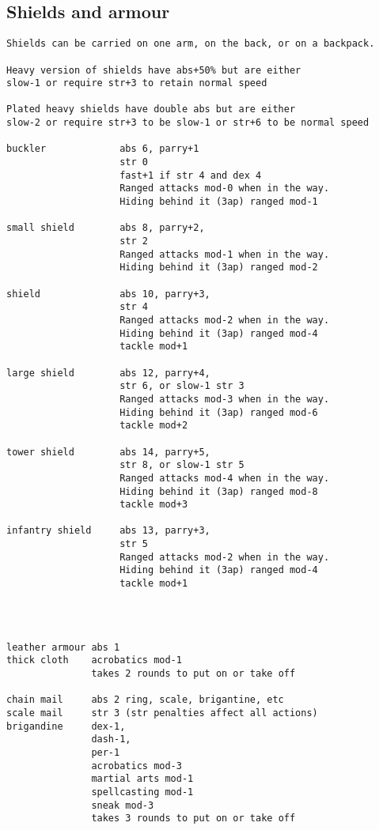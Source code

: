 \subsection*{Shields and armour}
\small
\begin{verbatim}
Shields can be carried on one arm, on the back, or on a backpack.

Heavy version of shields have abs+50% but are either
slow-1 or require str+3 to retain normal speed

Plated heavy shields have double abs but are either
slow-2 or require str+3 to be slow-1 or str+6 to be normal speed

buckler             abs 6, parry+1
                    str 0
                    fast+1 if str 4 and dex 4
                    Ranged attacks mod-0 when in the way.
                    Hiding behind it (3ap) ranged mod-1

small shield        abs 8, parry+2,
                    str 2
                    Ranged attacks mod-1 when in the way.
                    Hiding behind it (3ap) ranged mod-2

shield              abs 10, parry+3,
                    str 4
                    Ranged attacks mod-2 when in the way.
                    Hiding behind it (3ap) ranged mod-4
                    tackle mod+1

large shield        abs 12, parry+4,
                    str 6, or slow-1 str 3
                    Ranged attacks mod-3 when in the way.
                    Hiding behind it (3ap) ranged mod-6
                    tackle mod+2

tower shield        abs 14, parry+5,
                    str 8, or slow-1 str 5
                    Ranged attacks mod-4 when in the way.
                    Hiding behind it (3ap) ranged mod-8
                    tackle mod+3

infantry shield     abs 13, parry+3,
                    str 5
                    Ranged attacks mod-2 when in the way.
                    Hiding behind it (3ap) ranged mod-4
                    tackle mod+1




\end{verbatim} \pagebreak[3] \begin{verbatim}
leather armour abs 1
thick cloth    acrobatics mod-1
               takes 2 rounds to put on or take off

chain mail     abs 2 ring, scale, brigantine, etc
scale mail     str 3 (str penalties affect all actions)
brigandine     dex-1,
               dash-1,
               per-1
               acrobatics mod-3
               martial arts mod-1
               spellcasting mod-1
               sneak mod-3
               takes 3 rounds to put on or take off


\end{verbatim}
